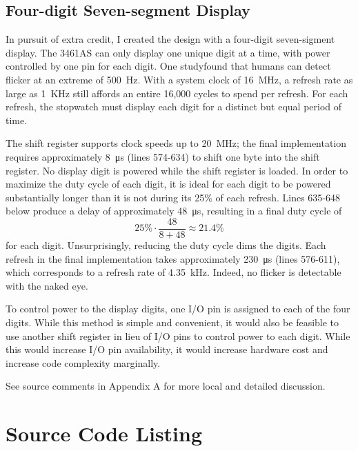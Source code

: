 \documentclass[12pt,letterpaper]{article}
\begin{document}
\subsection{Four-digit Seven-segment Display}
\par In pursuit of extra credit, I created the design with a four-digit
seven-sigment display. The 3461AS can only display one unique digit at a time,
with power controlled by one pin for each digit. One study\footnotemark[1]
found that humans can detect flicker at an extreme of \SI{500}{Hz}. With a
system clock of \SI{16}{MHz}, a refresh rate as large as \SI{1}{KHz} still
affords an entire 16,000 cycles to spend per refresh. For each refresh, the
stopwatch must display each digit for a distinct but equal period of time.
\par The shift register supports clock speeds up to \SI{20}{MHz}; the final
implementation requires approximately \SI{8}{\micro\second} (lines 574-634) to
shift one byte into the shift register. No display digit is powered while the shift
register is loaded. In order to maximize the duty cycle of each digit, it is
ideal for each digit to be powered substantially longer than it is not during
its 25\% of each refresh. Lines 635-648 below produce a delay of approximately
\SI{48}{\micro\second}, resulting in a final duty cycle of \[
	25\% \cdot \frac{48}{8+48}\approx 21.4\%
\] for each digit. Unsurprisingly, reducing the duty cycle dims the digits.
Each refresh in the final implementation takes approximately
\SI{230}{\micro\second} (lines 576-611), which corresponds to a refresh rate of
\SI{4.35}{kHz}. Indeed, no flicker is detectable with the naked eye.
\par To control power to the display digits, one I/O pin is assigned to each of
the four digits. While this method is simple and convenient, it would also be
feasible to use another shift register in lieu of I/O pins to control power to
each digit. While this would increase I/O pin availability, it would increase
hardware cost and increase code complexity {\footnotesize marginally}.
\par See source comments in Appendix A for more local and detailed discussion.

\newpage\appendix
\section{Source Code Listing}

\end{document}
